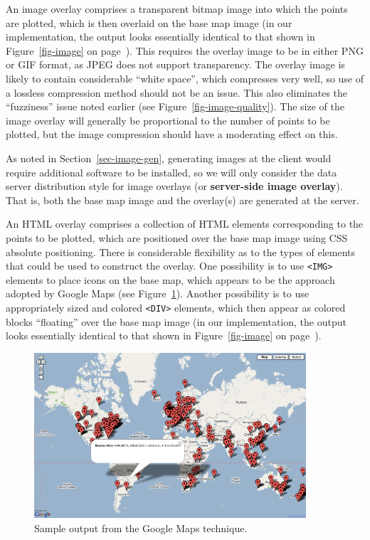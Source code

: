 \documentclass[acmnow]{acmtrans2m}
\begin{document}
An image overlay comprises a transparent bitmap image into which the
points are plotted, which is then overlaid on the base map image (in our
implementation, the output looks essentially identical to that shown in
Figure~\ref{fig-image} on page~\pageref{fig-image}). This requires the
overlay image to be in either PNG or GIF format, as JPEG does not
support transparency. The overlay image is likely to contain
considerable ``white space'', which compresses very well, so use of a
lossless compression method should not be an issue. This also eliminates
the ``fuzziness'' issue noted earlier (see
Figure~\ref{fig-image-quality}). The size of the image overlay will
generally be proportional to the number of points to be plotted, but the
image compression should have a moderating effect on this.

As noted in Section~\ref{sec-image-gen}, generating images at the client
would require additional software to be installed, so we will only
consider the data server distribution style for image overlays (or
\textbf{server-side image overlay}). That is, both the base map image
and the overlay(s) are generated at the server.

An HTML overlay comprises a collection of HTML elements corresponding to
the points to be plotted, which are positioned over the base map image
using CSS absolute positioning. There is considerable flexibility as to
the types of elements that could be used to construct the overlay. One
possibility is to use \verb|<IMG>| elements to place icons on the base
map, which appears to be the approach adopted by Google Maps (see
Figure~\ref{fig-google}). Another possibility is to use appropriately
sized and colored \verb|<DIV>| elements, which then appear as colored
blocks ``floating'' over the base map image (in our implementation, the
output looks essentially identical to that shown in
Figure~\ref{fig-image} on page~\pageref{fig-image}).


\begin{figure}
	\centering
	\includegraphics[width=0.9\textwidth,keepaspectratio]{GoogleMap-full.png}
	\caption{Sample output from the Google Maps technique.}
	\label{fig-google}
\end{figure}
\end{document}
